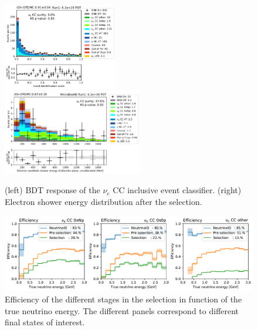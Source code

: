 \begin{figure}
    \centering
    \includegraphics[width=0.445\textwidth]{NueCCsel/Images/run1/pre_event_score.pdf}
    \includegraphics[width=0.545\textwidth]{NueCCsel/Images/run1/nue_shower_energy_y.pdf}
    \caption{(left) BDT response of the $\nu_e$ CC inclusive event classifier. (right) Electron shower energy distribution after the selection.}
    \label{fig:pre_event_score}
\end{figure}

\begin{figure}
    \centering
    \includegraphics[width=\textwidth]{NueCCsel/Images/run1/efficiency_cat_2.pdf}
    \caption{Efficiency of the different stages in the selection in function of the true neutrino energy. The different panels correspond to different final states of interest.}
    \label{fig:nueccinc_eff}
\end{figure}

